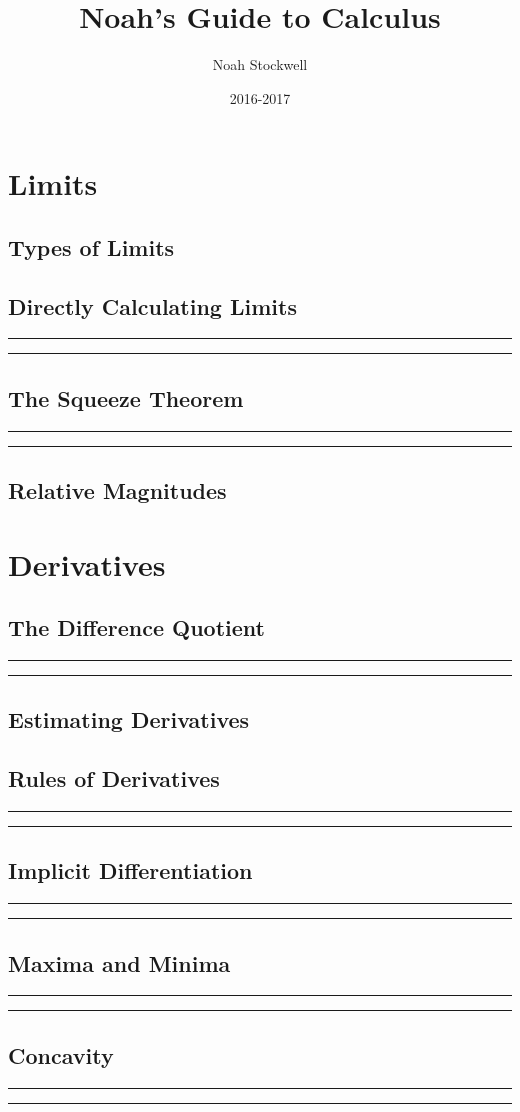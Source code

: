 \documentclass{article}
\title{Noah's Guide to Calculus}
\author{Noah Stockwell}
\date{2016-2017}
\newcommand{\newMidline}
{
	\noindent
	\rule{\textwidth}{.5pt}
}
\newcommand{\newchapter}[2]
{
	\subsection{#1}\vspace{.25in}\newMidline\newMidline\vspace{.125in}
}
\begin{document}
\maketitle
\vspace{2in}
\begin{center}\end{center}
\newpage

\newpage

\newpage
\tableofcontents
{}
\newpage
\section{Limits} 
\subsection{Types of Limits} 
\newpage\newchapter{Directly Calculating Limits}{DirectlyCalculatingLimits}
\newpage\subsection{The Squeeze Theorem}\newMidline\newMidline\vspace{.125in}
\subsection{Relative Magnitudes} \newpage
\newpage
{}
\newpage\section{Derivatives} 
\newchapter{The Difference Quotient}{DifferenceQuotient}
\subsection{Estimating Derivatives}
\newchapter{Rules of Derivatives}{DerivativeRules}
\newchapter{Implicit Differentiation}{ImplicitDifferentiation}
\newchapter{Maxima and Minima}{MaxAndMin}
\newchapter{Concavity}{Concavity}
\end{document}
